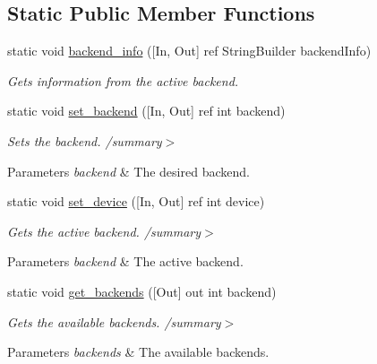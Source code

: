 \subsection*{Static Public Member Functions}
\begin{DoxyCompactItemize}
\item 
static void \mbox{\hyperlink{classkhiva_1_1interop_1_1_d_l_l_library_a7a21ec94c18f920773864e076ed96fdd}{backend\+\_\+info}} (\mbox{[}In, Out\mbox{]} ref String\+Builder backend\+Info)
\begin{DoxyCompactList}\small\item\em Gets information from the active backend.\end{DoxyCompactList}\item 
static void \mbox{\hyperlink{classkhiva_1_1interop_1_1_d_l_l_library_ad74860666bd91cc93b07f5b5d8d24984}{set\+\_\+backend}} (\mbox{[}In, Out\mbox{]} ref int backend)
\begin{DoxyCompactList}\small\item\em Sets the backend. /summary$>$ 
\begin{DoxyParams}{Parameters}
{\em backend} & The desired backend.\\
\hline
\end{DoxyParams}
\end{DoxyCompactList}\item 
static void \mbox{\hyperlink{classkhiva_1_1interop_1_1_d_l_l_library_aab970f341d2b40489672c960f6f67203}{set\+\_\+device}} (\mbox{[}In, Out\mbox{]} ref int device)
\begin{DoxyCompactList}\small\item\em Gets the active backend. /summary$>$ 
\begin{DoxyParams}{Parameters}
{\em backend} & The active backend.\\
\hline
\end{DoxyParams}
\end{DoxyCompactList}\item 
static void \mbox{\hyperlink{classkhiva_1_1interop_1_1_d_l_l_library_a9b85fc84cb87801da32b62119a58b710}{get\+\_\+backends}} (\mbox{[}Out\mbox{]} out int backend)
\begin{DoxyCompactList}\small\item\em Gets the available backends. /summary$>$ 
\begin{DoxyParams}{Parameters}
{\em backends} & The available backends.\\
\hline
\end{DoxyParams}
\end{DoxyCompactList}\item 

\end{DoxyCompactItemize}
